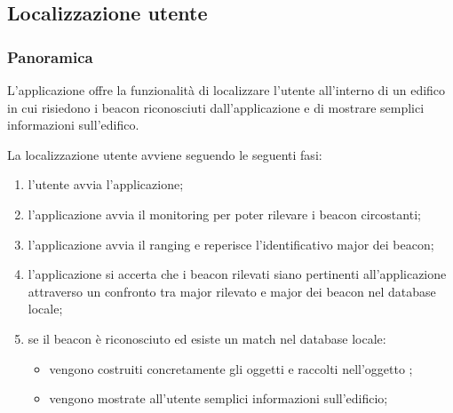 \documentclass[../Funzionalita.tex]{subfiles}
\begin{document}
\subsection{Localizzazione utente}
\label{subsec:LocalizzazioneUtente}
		
		\subsubsection{Panoramica}
			L'applicazione offre la funzionalità di localizzare l'utente all'interno di un edifico in cui risiedono i beacon riconosciuti dall'applicazione e di mostrare semplici informazioni sull'edifico.
			
			La localizzazione utente avviene seguendo le seguenti fasi:
			\begin{enumerate}
				\item l'utente avvia l'applicazione;
				\item l'applicazione avvia il monitoring per poter rilevare i beacon circostanti;
				\item l'applicazione avvia il ranging e reperisce l'identificativo major dei beacon;
				\item l'applicazione si accerta che i beacon rilevati siano pertinenti all'applicazione attraverso un confronto tra major rilevato e major dei beacon nel database locale;
				\item se il beacon è riconosciuto ed esiste un match nel database locale:
					\begin{itemize}
						\item vengono costruiti concretamente gli oggetti e raccolti nell'oggetto \BuildingMap;
						\item vengono mostrate all'utente semplici informazioni sull'edificio;
					\end{itemize}
			\end{enumerate}
			
\end{document}
